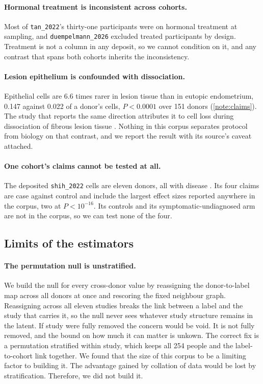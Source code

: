 \paragraph{Hormonal treatment is inconsistent across cohorts.} Most of
\texttt{tan\_2022}'s thirty-one participants were on hormonal treatment at
sampling, and \texttt{duempelmann\_2026} excluded treated participants by
design. Treatment is not a column in any deposit, so we cannot condition on
it, and any contrast that spans both cohorts inherits the inconsistency.

\paragraph{Lesion epithelium is confounded with dissociation.} Epithelial
cells are 6.6 times rarer in lesion tissue than in eutopic endometrium,
0.147 against 0.022 of a donor's cells, $P < 0.0001$ over 151 donors
(\ref{note:claims}). The study that reports the same
direction attributes it to cell loss during dissociation of fibrous lesion
tissue \citep{sarsenova2024metabolic}. Nothing in this corpus separates
protocol from biology on that contrast, and we report the result with its
source's caveat attached.

\paragraph{One cohort's claims cannot be tested at all.} The deposited
\texttt{shih\_2022} cells are eleven donors, all with disease
\citep{shih2022menstrual}. Its four claims are case against control and
include the largest effect sizes reported anywhere in the corpus, two at
$P < 10^{-16}$. Its controls and its symptomatic-undiagnosed arm are not in
the corpus, so we can test none of the four.

\subsection{Limits of the estimators}

\paragraph{The permutation null is unstratified.} We build the null for
every cross-donor value by reassigning the donor-to-label map across all
donors at once and rescoring the fixed neighbour graph. Reassigning across
all eleven studies breaks the link between a label and the study that
carries it, so the null never sees whatever study structure remains in the
latent. If study were fully removed the concern would be void. It is not
fully removed, and the bound on how much it can matter is unkown. The 
correct fix is a permutation stratified within study, which keeps all 
254 people and the label-to-cohort link together. We found that the size 
of this corpus to be a limiting factor to building it. The advantage 
gained by collation of data would be lost by stratification. Therefore, 
we did not build it.

